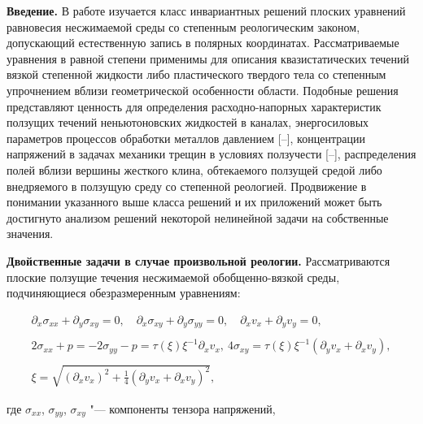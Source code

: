 {\bf Введение.} В работе изучается класс инвариантных решений плоских уравнений равновесия несжимаемой среды со степенным реологическим законом, допускающий естественную запись в полярных координатах. Рассматриваемые уравнения в равной степени применимы для описания квазистатических течений вязкой степенной жидкости либо пластического твердого тела со степенным упрочнением вблизи геометрической особенности области. Подобные решения представляют ценность для определения расходно-напорных характеристик ползущих течений неньютоновских жидкостей в каналах, энергосиловых параметров процессов обработки металлов давлением [--], концентрации напряжений в задачах механики трещин в условиях ползучести [--], распределения полей вблизи вершины жесткого клина, обтекаемого ползущей средой либо внедряемого в ползущую среду со степенной реологией. Продвижение в понимании указанного выше класса решений и их приложений может быть достигнуто  анализом решений некоторой нелинейной задачи на собственные значения. 



\smallskip



{\bf Двойственные задачи в случае произвольной реологии.} Рассматриваются плоские ползущие течения несжимаемой обобщенно-вязкой среды, подчиняющиеся обезразмеренным уравнениям: 

\begin{equation} 

\label{keller:eq:1}

\begin{array}{c} {\partial_x\sigma_{xx}+\partial_y\sigma_{xy}=0,\quad \partial_x\sigma_{xy}+\partial_y\sigma_{yy}=0,\quad \partial_x v_x+\partial_y v_y =0,} \\ {}\\ {2\sigma_{xx} +p=-2\sigma_{yy} -p=\tau(\xi)\xi^{-1}\partial_x v_x,\ 4\sigma_{xy} =\tau(\xi)\xi^{-1}\left(\partial_y v_x+\partial_x v_y\right),} \\ {} \\ {\xi =\sqrt{\left(\partial_x v_x\right)^{2} +\frac{1}{4} \left(\partial_y v_x+\partial_x v_y\right)^{2} } ,} \end{array}

\end{equation}

где $\sigma_{xx}$, $\sigma_{yy}$, $\sigma_{xy}$ "--- компоненты тензора напряжений, 

